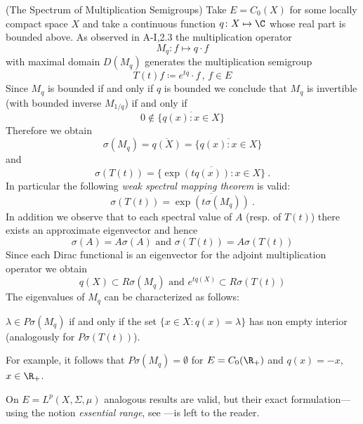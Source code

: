 \begin{example}\label{ex:a3-2.3}
{(The Spectrum of Multiplication Semigroups)}
%
Take $E = C_{0}(X)$ for some locally compact space $X$ and take a continuous function $q \colon X \mapsto \C$ whose real part is bounded above.
As observed in A-I,2.3 the multiplication operator
\[
M_{q} \colon f \mapsto q \cdot f
\]
with maximal domain $D(M_{q})$ generates the multiplication semigroup
\[
T(t)f \coloneqq e^{tq} \cdot f \, , \, f \in E
\]
Since $M_{q}$ is bounded if and only if $q$ is bounded we conclude that $M_{q}$ is invertible (with bounded inverse $M_{1/q}$) if and only if
\[
0 \notin \overline{\{q(x)  \colon x \in X\}}
\]
Therefore we obtain
\[
\sigma(M_{q}) = \overline{q(X)} = \overline{\{q(x) \colon x \in X\}}
\]
and
\[
\sigma(T(t)) = \overline{\{\exp(tq(x)) \colon x \in X\}}~.
\]
In particular the following \emph{weak spectral mapping theorem} is valid:
\[
\sigma(T(t)) = \overline{\exp(t\sigma(M_{q}))}~.
\]
In addition we observe that to each spectral value of $A$ (resp. of $T(t)$) there exists an approximate eigenvector and hence
\[
\sigma(A) = A\sigma(A) \text{ and } \sigma(T(t)) = A\sigma(T(t))
\]
Since each Dirac functional is an eigenvector for the adjoint multiplication operator we obtain
\[
q(X) \subset R\sigma(M_{q}) \text{ and } e^{tq(X)} \subset R\sigma(T(t))
\]
The eigenvalues of $M_{q}$ can be characterized as follows:

$\lambda \in P\sigma(M_{q})$ if and only if the set $\{x \in X \colon q(x) = \lambda\}$ has non empty interior (analogously for $P\sigma(T(t))$).

For example, it follows that $P\sigma(M_{q}) = \emptyset$ for $E = C_{0}(\R_{+})$ and $q(x) = -x$, $x \in \R_{+}$.

On $E = L^{p}(X,\Sigma,\mu)$ analogous results are valid, but their exact formulation---using the notion \emph{essential range}, see \citet{goldstein:1985a}---is left to the reader.
\end{example}
